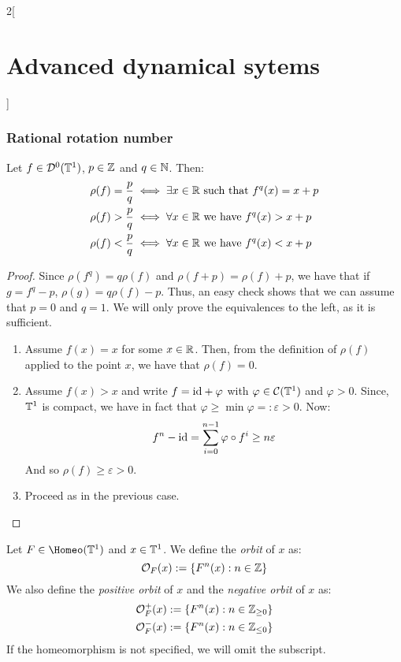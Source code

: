 \documentclass[../../../main_math.tex]{subfiles}
\begin{document}
\begin{multicols}{2}[\section{Advanced dynamical sytems}]
  \subsubsection{Rational rotation number}
  \begin{proposition}\label{ADS:characterisation_rot_number}
    Let $f\in \mathcal{D}^0(\mathbb{T}^1)$, $p\in\mathbb{Z}$ and $q\in\mathbb{N}$. Then:
    \begin{align*}
      \rho(f)=\frac{p}{q} & \iff \exists x\in\mathbb{R}\text{ such that }f^q(x)=x+p \\
      \rho(f)>\frac{p}{q} & \iff \forall x\in\mathbb{R}\text{ we have }f^q(x)>x+p   \\
      \rho(f)<\frac{p}{q} & \iff \forall x\in\mathbb{R}\text{ we have }f^q(x)<x+p
    \end{align*}
  \end{proposition}
  \begin{proof}
    Since $\rho(f^q)= q\rho(f)$ and $\rho(f+p)=\rho(f)+p$, we have that if $g=f^q-p$, $\rho(g)=q \rho(f)-p$. Thus, an easy check shows that we can assume that $p=0$ and $q=1$. We will only prove the equivalences to the left, as it is sufficient.
    \begin{enumerate}
      \item Assume $f(x)=x$ for some $x\in\mathbb{R}$. Then, from the definition of $\rho(f)$ applied to the point $x$, we have that $\rho(f)=0$.
      \item Assume $f(x)>x$ and write $f=\mathrm{id}+\varphi$ with $\varphi\in\mathcal{C}(\mathbb{T}^1)$ and $\varphi>0$. Since, $\mathbb{T}^1$ is compact, we have in fact that $\varphi\geq \min\varphi=:\varepsilon>0$. Now:
            $$
              f^n-\mathrm{id} = \sum_{i=0}^{n-1}\varphi\circ f^i\geq n\varepsilon
            $$
            And so $\rho(f)\geq \varepsilon>0$.
      \item Proceed as in the previous case.
    \end{enumerate}
  \end{proof}
  \begin{definition}
    Let $F\in\Homeo(\TT^1)$ and $x\in \mathbb{T}^1$. We define the \emph{orbit} of $x$ as:
    $$
      \mathcal{O}_F(x):=\{F^n(x):n\in\mathbb{Z}\}
    $$
    We also define the \emph{positive orbit} of $x$  and the \emph{negative orbit} of $x$ as:
    \begin{align*}
      \mathcal{O}_F^+(x) & :=\{F^n(x):n\in\mathbb{Z}_{\geq 0}\} \\
      \mathcal{O}_F^-(x) & :=\{F^n(x):n\in\mathbb{Z}_{\leq 0}\}
    \end{align*}
    If the homeomorphism is not specified, we will omit the subscript.

\end{definition}
\end{multicols}
\end{document}
